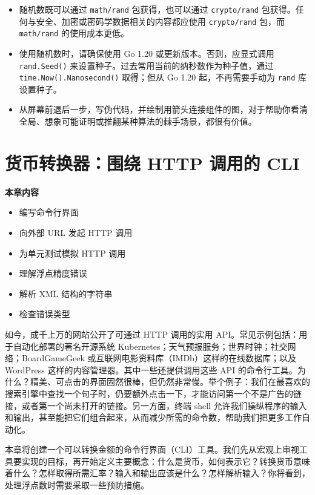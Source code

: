 \begin{itemize}
\item 随机数既可以通过 \texttt{math/rand} 包获得，也可以通过 \texttt{crypto/rand} 包获得。任何与安全、加密或密码学数据相关的内容都应使用 \texttt{crypto/rand} 包，而 \texttt{math/rand} 的使用成本更低。

\item 使用随机数时，请确保使用 Go 1.20 或更新版本。否则，应显式调用 \texttt{rand.Seed()} 来设置种子。过去常用当前的纳秒数作为种子值，通过 \texttt{time.Now().Nanosecond()} 取得；但从 Go 1.20 起，不再需要手动为 \texttt{rand} 库设置种子。

\item 从屏幕前退后一步，写伪代码，并绘制用箭头连接组件的图，对于帮助你看清全局、想象可能证明或推翻某种算法的棘手场景，都很有价值。
\end{itemize}

\chapter{货币转换器：围绕 HTTP 调用的 CLI}

\textbf{本章内容}

\begin{itemize}
\item 编写命令行界面
\item 向外部 URL 发起 HTTP 调用
\item 为单元测试模拟 HTTP 调用
\item 理解浮点精度错误
\item 解析 XML 结构的字符串
\item 检查错误类型
\end{itemize}

如今，成千上万的网站公开了可通过 HTTP 调用的实用 API。常见示例包括：用于自动化部署的著名开源系统 Kubernetes；天气预报服务；世界时钟；社交网络；BoardGameGeek 或互联网电影资料库（IMDb）这样的在线数据库；以及 WordPress 这样的内容管理器。其中一些还提供调用这些 API 的命令行工具。为什么？精美、可点击的界面固然很棒，但仍然非常慢。举个例子：我们在最喜欢的搜索引擎中查找一个句子时，仍要额外点击一下，才能访问第一个不是广告的链接，或者第一个尚未打开的链接。另一方面，终端 shell 允许我们操纵程序的输入和输出，甚至能把它们组合起来，从而减少所需的命令数，帮助我们把更多工作自动化。

本章将创建一个可以转换金额的命令行界面（CLI）工具。我们先从宏观上审视工具要实现的目标，再开始定义主要概念：什么是货币，如何表示它？转换货币意味着什么？怎样取得所需汇率？输入和输出应该是什么？怎样解析输入？你将看到，处理浮点数时需要采取一些预防措施。

